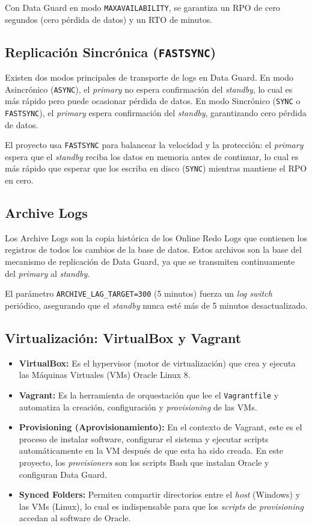 \documentclass[11pt, a4paper]{report}
\begin{document}
Con Data Guard en modo \texttt{MAXAVAILABILITY}, se garantiza un RPO de cero segundos (cero pérdida de datos) y un RTO de minutos.
\subsection{Replicación Sincrónica (\texttt{FASTSYNC})}

Existen dos modos principales de transporte de logs en Data Guard. En modo Asincrónico (\texttt{ASYNC}), el \textit{primary} no espera confirmación del \textit{standby}, lo cual es más rápido pero puede ocasionar pérdida de datos. En modo Sincrónico (\texttt{SYNC} o \texttt{FASTSYNC}), el \textit{primary} espera confirmación del \textit{standby}, garantizando cero pérdida de datos.

El proyecto usa \texttt{FASTSYNC} para balancear la velocidad y la protección: el \textit{primary} espera que el \textit{standby} reciba los datos en memoria antes de continuar, lo cual es más rápido que esperar que los escriba en disco (\texttt{SYNC}) mientras mantiene el RPO en cero.
\subsection{Archive Logs}

Los Archive Logs son la copia histórica de los Online Redo Logs que contienen los registros de todos los cambios de la base de datos. Estos archivos son la base del mecanismo de replicación de Data Guard, ya que se transmiten continuamente del \textit{primary} al \textit{standby}.

El parámetro \texttt{ARCHIVE\_LAG\_TARGET=300} (5 minutos) fuerza un \textit{log switch} periódico, asegurando que el \textit{standby} nunca esté más de 5 minutos desactualizado.

\subsection{Virtualización: VirtualBox y Vagrant}

\begin{itemize}
    \item \textbf{VirtualBox:} Es el hypervisor (motor de virtualización) que crea y ejecuta las Máquinas Virtuales (VMs) Oracle Linux 8.
    \item \textbf{Vagrant:} Es la herramienta de orquestación que lee el \texttt{Vagrantfile} y automatiza la creación, configuración y \textit{provisioning} de las VMs.
    \item \textbf{Provisioning (Aprovisionamiento):} En el contexto de Vagrant, este es el proceso de instalar software, configurar el sistema y ejecutar scripts automáticamente en la VM después de que esta ha sido creada. En este proyecto, los \textit{provisioners} son los scripts Bash que instalan Oracle y configuran Data Guard.
    \item \textbf{Synced Folders:} Permiten compartir directorios entre el \textit{host} (Windows) y las VMs (Linux), lo cual es indispensable para que los \textit{scripts} de \textit{provisioning} accedan al software de Oracle.
\end{itemize}
\end{document}
